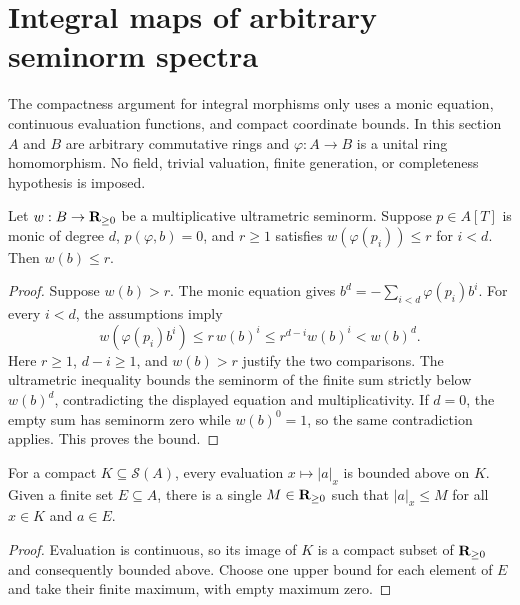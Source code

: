 \section{Integral maps of arbitrary seminorm spectra}\label{sec:integral-spectrum-maps}

The compactness argument for integral morphisms only uses a monic equation,
continuous evaluation functions, and compact coordinate bounds. In this section
$A$ and $B$ are arbitrary commutative rings and $\varphi:A\to B$ is a unital
ring homomorphism. No field, trivial valuation, finite generation, or
completeness hypothesis is imposed.

\begin{lemma}\label{spectrum:integral-root-bound}
\leanok
Let $w:B\to\mathbf{R}_{\ge0}$ be a multiplicative ultrametric seminorm. Suppose
$p\in A[T]$ is monic of degree $d$, $p(\varphi,b)=0$, and $r\ge1$ satisfies
$w(\varphi(p_i))\le r$ for $i<d$. Then $w(b)\le r$.
\end{lemma}
\begin{proof}
Suppose $w(b)>r$. The monic equation gives
$b^d=-\sum_{i<d}\varphi(p_i)b^i$. For every $i<d$, the assumptions imply
\[
w(\varphi(p_i)b^i)\le r\,w(b)^i
\le r^{d-i}w(b)^i < w(b)^d.
\]
Here $r\ge1$, $d-i\ge1$, and $w(b)>r$ justify the two comparisons.
The ultrametric inequality bounds the seminorm of the finite sum strictly
below $w(b)^d$, contradicting the displayed equation and multiplicativity.
If $d=0$, the empty sum has seminorm zero while $w(b)^0=1$, so the same
contradiction applies. This proves the bound.
\end{proof}

\begin{lemma}\label{spectrum:compact-evaluation-bounds}
\leanok
{}
For a compact $K\subseteq\mathcal S(A)$, every evaluation $x\mapsto|a|_x$
is bounded above on $K$. Given a finite set $E\subseteq A$, there is a
single $M\in\mathbf{R}_{\ge0}$ such that $|a|_x\le M$ for all $x\in K$ and $a\in E$.
\end{lemma}
\begin{proof}
Evaluation is continuous, so its image of $K$ is a compact subset of
$\mathbf{R}_{\ge0}$ and consequently bounded above. Choose one upper bound for
each element of $E$ and take their finite maximum, with empty maximum zero.
\end{proof}

